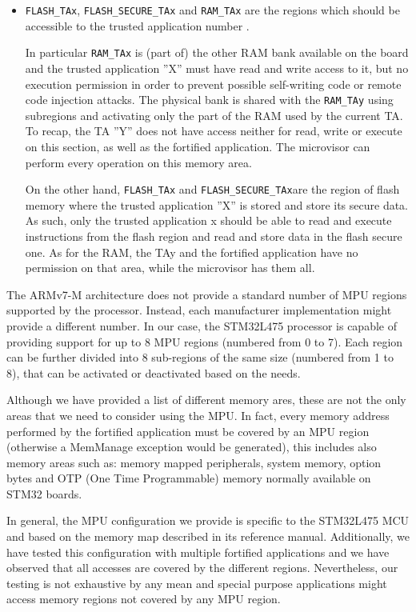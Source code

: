 \documentclass{article}
\begin{document}
\begin{itemize}
    \item \verb|FLASH_TAx|, \verb|FLASH_SECURE_TAx| and \verb|RAM_TAx| are the regions which should be accessible to the trusted application number . 

    In particular \verb|RAM_TAx| is (part of) the other RAM bank available on the board and the trusted application ''X'' must have read and write access to it, but no execution permission in order to prevent possible self-writing code or remote code injection attacks. The physical bank is shared with the \verb|RAM_TAy| using subregions and activating only the part of the RAM used by the current TA. To recap, the TA ''Y'' does not have access neither for read, write or execute on this section, as well as the fortified application. The microvisor can perform every operation on this memory area.  
	
	On the other hand, \verb|FLASH_TAx| and \verb|FLASH_SECURE_TAx|are the region of flash memory where the trusted application ''X'' is stored and store its secure data. As such, only the trusted application x should be able to read and execute instructions from the flash region and read and store data in the flash secure one. As for the RAM, the TAy and the fortified application have no permission on that area, while the microvisor has them all. 
\end{itemize}

The ARMv7-M architecture does not provide a standard number of MPU regions supported by the processor. Instead, each manufacturer implementation might provide a different number. In our case, the STM32L475 processor is capable of providing support for up to 8 MPU regions (numbered from 0 to 7). Each region can be further divided into 8 sub-regions of the same size (numbered from 1 to 8), that can be activated or deactivated based on the needs. 

Although we have provided a list of different memory ares, these are not the only areas that we need to consider using the MPU. In fact, every memory address performed by the fortified application must be covered by an MPU region (otherwise a MemManage exception would be generated), this includes also memory areas such as: memory mapped peripherals, system memory, option bytes and OTP (One Time Programmable) memory normally available on STM32 boards.

In general, the MPU configuration we provide is specific to the STM32L475 MCU and based on the memory map described in its reference manual\cite{rm0351}.
Additionally, we have tested this configuration with multiple fortified applications and we have observed that all accesses are covered by the different regions. Nevertheless, our testing is not exhaustive by any mean and special purpose applications might access memory regions not covered by any MPU region.
\end{document}
